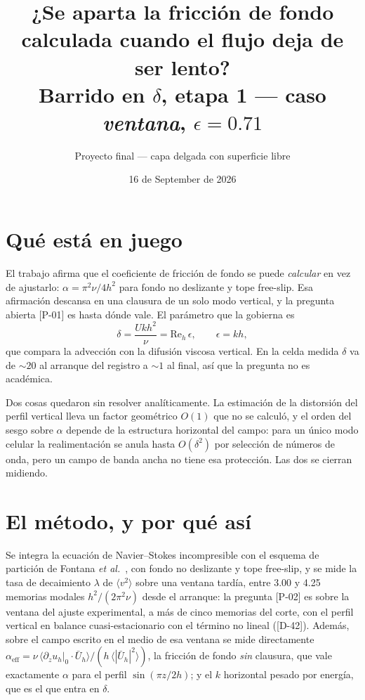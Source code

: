 \documentclass[11pt,a4paper]{article}
\title{¿Se aparta la fricción de fondo calculada cuando el flujo deja de ser lento?\\
\large Barrido en $\delta$, etapa 1 --- caso \emph{ventana}, $\epsilon = 0.71$}
\author{Proyecto final --- capa delgada con superficie libre}
\date{16 de September de 2026}
\begin{document}
\maketitle

\section{Qué está en juego}

El trabajo afirma que el coeficiente de fricción de fondo se puede \emph{calcular} en vez
de ajustarlo: $\alpha = \pi^2\nu/4h^2$ para fondo no deslizante y tope free-slip. Esa
afirmación descansa en una clausura de un solo modo vertical, y la pregunta abierta
[P-01] es hasta dónde vale. El parámetro que la gobierna es
\begin{equation}
  \delta = \frac{U k h^2}{\nu} = \mathrm{Re}_h\,\epsilon , \qquad \epsilon = k h ,
\end{equation}
que compara la advección con la difusión viscosa vertical. En la celda medida $\delta$ va
de $\sim 20$ al arranque del registro a $\sim 1$ al final, así que la pregunta no es
académica.

Dos cosas quedaron sin resolver analíticamente. La estimación de la distorsión del perfil
vertical lleva un factor geométrico $O(1)$ que no se calculó, y el orden del sesgo sobre
$\alpha$ depende de la estructura horizontal del campo: para un único modo celular la
realimentación se anula hasta $O(\delta^2)$ por selección de números de onda, pero un
campo de banda ancha no tiene esa protección. Las dos se cierran midiendo.

\section{El método, y por qué así}

Se integra la ecuación de Navier--Stokes incompresible con el esquema de partición de
Fontana \emph{et al.}~\cite{fontana2020}, con fondo no deslizante y tope free-slip,
y se mide la tasa de decaimiento $\lambda$ de $\langle v^2\rangle$ sobre una ventana
tardía, entre 3.00 y 4.25 memorias modales $h^2/(2\pi^2\nu)$ desde el arranque:
la pregunta [P-02] es sobre la ventana del ajuste experimental, a más de cinco memorias
del corte, con el perfil vertical en balance cuasi-estacionario con el término no lineal
([D-42]). Además, sobre el campo escrito en el medio de esa ventana se mide directamente
$\alpha_\text{eff} = \nu\,\langle \partial_z u_h|_0 \cdot \bar U_h\rangle / (h\,\langle|\bar U_h|^2\rangle)$,
la fricción de fondo \emph{sin} clausura, que vale exactamente $\alpha$ para el perfil
$\sin(\pi z/2h)$; y el $k$ horizontal pesado por energía, que es el que entra en $\delta$.
\end{document}
